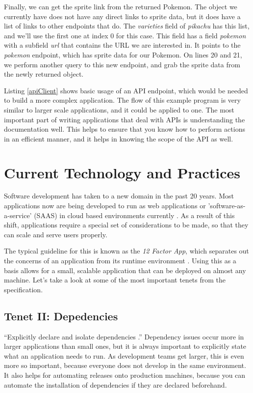 \documentclass[12pt, oneside, a4paper]{book}
\begin{document}
      Finally, we can get the sprite link from the returned Pokemon.
      The object we currently have does not have any direct links to sprite data, but it does have a list of links to other endpoints that do.
      The \textit{varieties} field of \textit{pikachu} has this list, and we'll use the first one at index 0 for this case.
      This field has a field \textit{pokemon} with a subfield \textit{url} that contains the URL we are interested in.
      It points to the \textit{pokemon} endpoint, which has sprite data for our Pokemon.
      On lines 20 and 21, we perform another query to this new endpoint, and grab the sprite data from the newly returned object.

      Listing \ref{apiClient} shows basic usage of an API endpoint, which would be needed to build a more complex application.
      The flow of this example program is very similar to larger scale applications, and it could be applied to one.
      The most important part of writing applications that deal with APIs is understanding the documentation well.
      This helps to ensure that you know how to perform actions in an efficient manner, and it helps in knowing the scope of the API as well.

      \section{Current Technology and Practices}
      Software development has taken to a new domain in the past 20 years.
      Most applications now are being developed to run as web applications or 'software-as-a-service' (SAAS) in cloud based environments currently \autocite{WhatCloudComputing}.
      As a result of this shift, applications require a special set of considerations to be made, so that they can scale and serve users properly.

      The typical guideline for this is known as the \textit{12 Factor App\footnotemark}, which separates out the concerns of an application from its runtime environment \autocite{wigginsTwelveFactorApp2017}.
      Using this as a basis allows for a small, scalable application that can be deployed on almost any machine.
      Let's take a look at some of the most important tenets from the specification.

      \subsection{Tenet II: Depedencies}
      ``Explicitly declare and isolate dependencies \autocite{wigginsTwelveFactorApp2017}.''
      Dependency issues occur more in larger applications than small ones, but it is always important to explicitly state what an application needs to run.
      As development teams get larger, this is even more so important, because everyone does not develop in the same environment.
      It also helps for automating releases onto production machines, because you can automate the installation of dependencies if they are declared beforehand.
\end{document}
